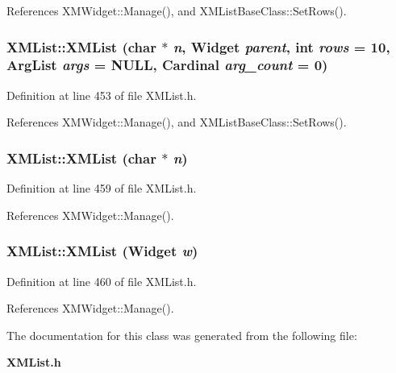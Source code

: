 References XMWidget::Manage(), and XMList\-Base\-Class::Set\-Rows().
\subsubsection{\setlength{\rightskip}{0pt plus 5cm}XMList::XMList (char $\ast$ {\em n}, Widget {\em parent}, int {\em rows} = 10, Arg\-List {\em args} = NULL, Cardinal {\em arg\_\-count} = 0)\hspace{0.3cm}{\tt  [inline]}}\label{classXMList_a1}




Definition at line 453 of file XMList.h.

References XMWidget::Manage(), and XMList\-Base\-Class::Set\-Rows().
\subsubsection{\setlength{\rightskip}{0pt plus 5cm}XMList::XMList (char $\ast$ {\em n})\hspace{0.3cm}{\tt  [inline]}}\label{classXMList_a2}




Definition at line 459 of file XMList.h.

References XMWidget::Manage().
\subsubsection{\setlength{\rightskip}{0pt plus 5cm}XMList::XMList (Widget {\em w})\hspace{0.3cm}{\tt  [inline]}}\label{classXMList_a3}




Definition at line 460 of file XMList.h.

References XMWidget::Manage().

The documentation for this class was generated from the following file:\begin{CompactItemize}
\item 
{\bf XMList.h}\end{CompactItemize}
